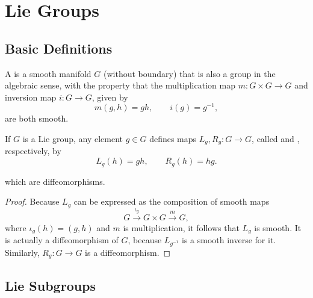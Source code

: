 \documentclass[../main.tex]{subfiles}
\begin{document}
\ifSubfilesClassLoaded{

    \tableofcontents
    
}{}

\chapter{ Lie Groups }

\section{Basic Definitions}
\begin{definition}{}{}
    A  is a smooth manifold $G$ (without boundary) that is also a group in the algebraic sense, with the property that the multiplication map $m\colon G\times G\to G$ and inversion map $i\colon G\to G$, given by
\[
m(g,h)=gh,\qquad i(g)=g^{-1},
\]
are both smooth. 
\end{definition}

\begin{definition}{}{}
    If \(G\) is a Lie group, any element \(g\in G\) defines maps \(L_{g},R_{g}:G\to G\), called  and , respectively, by
\[
L_{g}(h)=gh,\qquad R_{g}(h)=hg.
\]

which are diffeomorphisms.
\end{definition}

\begin{proof}
    
Because \(L_{g}\) can be expressed as the composition of smooth maps
\[
G\xrightarrow{\ \iota_{g}\ }G\times G\xrightarrow{\ m\ }G,
\]
where \(\iota_{g}(h)=(g,h)\) and \(m\) is multiplication, it follows that \(L_{g}\) is smooth. It is actually a diffeomorphism of \(G\), because \(L_{g^{-1}}\) is a smooth inverse for it. Similarly, \(R_{g}:G\to G\) is a diffeomorphism.
\end{proof}
\section{Lie Subgroups}
\end{document}
